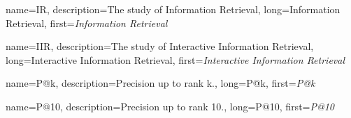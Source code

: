 






{
    name={IR},
    description={The study of Information Retrieval},
    long={Information Retrieval},
    first={\emph{Information Retrieval}}
}

{
    name={IIR},
    description={The study of Interactive Information Retrieval},
    long={Interactive Information Retrieval},
    first={\emph{Interactive Information Retrieval}}
}

{
    name={P@k},
    description={Precision up to rank k.},
    long={P@k},
    first={\emph{P@k}}
}

{
    name={P@10},
    description={Precision up to rank 10.},
    long={P@10},
    first={\emph{P@10}}
}


\makeglossaries